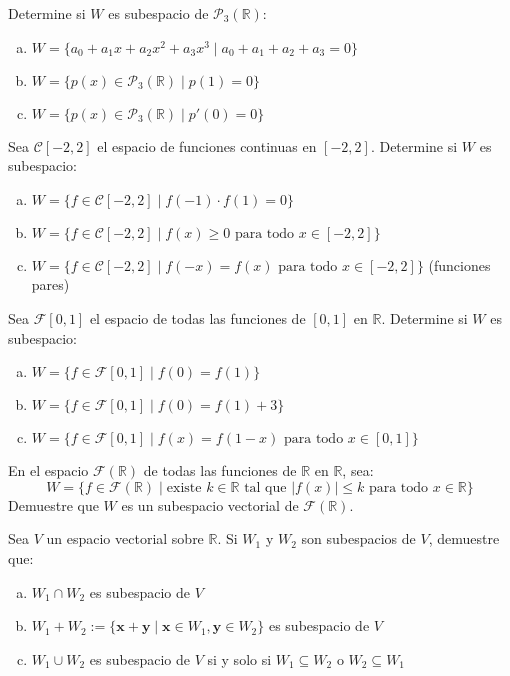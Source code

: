 \begin{prob} Determine si $W$ es subespacio de $\mathcal{P}_3(\mathbb{R})$:
\begin{enumerate}[(a)]
\item $W = \{a_0 + a_1x + a_2x^2 + a_3x^3 \mid a_0 + a_1 + a_2 + a_3 = 0\}$
\item $W = \{p(x) \in \mathcal{P}_3(\mathbb{R}) \mid p(1) = 0\}$
\item $W = \{p(x) \in \mathcal{P}_3(\mathbb{R}) \mid p'(0) = 0\}$
\end{enumerate}
\end{prob}

\begin{prob} Sea $\mathcal{C}[-2,2]$ el espacio de funciones continuas en $[-2,2]$. Determine si $W$ es subespacio:
\begin{enumerate}[(a)]
\item $W = \{f \in \mathcal{C}[-2,2] \mid f(-1) \cdot f(1) = 0\}$
\item $W = \{f \in \mathcal{C}[-2,2] \mid f(x) \geq 0 \text{ para todo } x \in [-2,2]\}$
\item $W = \{f \in \mathcal{C}[-2,2] \mid f(-x) = f(x) \text{ para todo } x \in [-2,2]\}$ (funciones pares)
\end{enumerate}
\end{prob}

\begin{prob} Sea $\mathcal{F}[0,1]$ el espacio de todas las funciones de $[0,1]$ en $\mathbb{R}$. Determine si $W$ es subespacio:
\begin{enumerate}[(a)]
\item $W = \{f \in \mathcal{F}[0,1] \mid f(0) = f(1)\}$
\item $W = \{f \in \mathcal{F}[0,1] \mid f(0) = f(1) + 3\}$
\item $W = \{f \in \mathcal{F}[0,1] \mid f(x) = f(1-x) \text{ para todo } x \in [0,1]\}$
\end{enumerate}
\end{prob}

\begin{prob} En el espacio $\mathcal{F}(\mathbb{R})$ de todas las funciones de $\mathbb{R}$ en $\mathbb{R}$, sea:
$$W = \{f \in \mathcal{F}(\mathbb{R}) \mid \text{existe } k \in \mathbb{R} \text{ tal que } |f(x)| \leq k \text{ para todo } x \in \mathbb{R}\}$$
Demuestre que $W$ es un subespacio vectorial de $\mathcal{F}(\mathbb{R})$.
\end{prob}

\begin{prob} Sea $V$ un espacio vectorial sobre $\mathbb{R}$. Si $W_1$ y $W_2$ son subespacios de $V$, demuestre que:
\begin{enumerate}[(a)]
\item $W_1 \cap W_2$ es subespacio de $V$
\item $W_1 + W_2 := \{\mathbf{x} + \mathbf{y} \mid \mathbf{x} \in W_1, \mathbf{y} \in W_2\}$ es subespacio de $V$
\item $W_1 \cup W_2$ es subespacio de $V$ si y solo si $W_1 \subseteq W_2$ o $W_2 \subseteq W_1$
\end{enumerate}
\end{prob}



